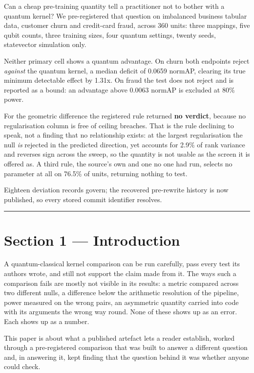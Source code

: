 \documentclass[
  10pt,
]{article}
\begin{document}
Can a cheap pre-training quantity tell a practitioner not to bother with
a quantum kernel? We pre-registered that question on imbalanced business
tabular data, customer churn and credit-card fraud, across 360 units:
three mappings, five qubit counts, three training sizes, four quantum
settings, twenty seeds, statevector simulation only.

Neither primary cell shows a quantum advantage. On churn both endpoints
reject \emph{against} the quantum kernel, a median deficit of 0.0659
normAP, clearing its true minimum detectable effect by 1.31x. On fraud
the test does not reject and is reported as a bound: an advantage above
0.0063 normAP is excluded at 80\% power.

For the geometric difference the registered rule returned \textbf{no
verdict}, because no regularisation column is free of ceiling breaches.
That is the rule declining to speak, not a finding that no relationship
exists: at the largest regularisation the null \emph{is} rejected in the
predicted direction, yet accounts for 2.9\% of rank variance and
reverses sign across the sweep, so the quantity is not usable as the
screen it is offered as. A third rule, the source's own and one no one
had run, selects no parameter at all on 76.5\% of units, returning
nothing to test.

Eighteen deviation records govern; the recovered pre-rewrite history is
now published, so every stored commit identifier resolves.

\begin{center}\rule{0.5\linewidth}{0.5pt}\end{center}

\section{Section 1 --- Introduction}\label{section-1-introduction}

A quantum-classical kernel comparison can be run carefully, pass every
test its authors wrote, and still not support the claim made from it.
The ways such a comparison fails are mostly not visible in its results:
a metric compared across two different nulls, a difference below the
arithmetic resolution of the pipeline, power measured on the wrong
pairs, an asymmetric quantity carried into code with its arguments the
wrong way round. None of these shows up as an error. Each shows up as a
number.

This paper is about what a published artefact lets a reader establish,
worked through a pre-registered comparison that was built to answer a
different question and, in answering it, kept finding that the question
behind it was whether anyone could check.
\end{document}
